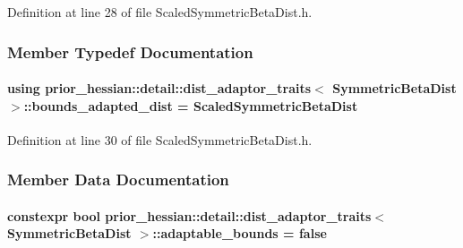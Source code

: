 Definition at line 28 of file Scaled\+Symmetric\+Beta\+Dist.\+h.



\subsubsection{Member Typedef Documentation}
\paragraph[{\texorpdfstring{bounds\+\_\+adapted\+\_\+dist}{bounds_adapted_dist}}]{\setlength{\rightskip}{0pt plus 5cm}using {\bf prior\+\_\+hessian\+::detail\+::dist\+\_\+adaptor\+\_\+traits}$<$ {\bf Symmetric\+Beta\+Dist} $>$\+::{\bf bounds\+\_\+adapted\+\_\+dist} =  {\bf Scaled\+Symmetric\+Beta\+Dist}}\hypertarget{structprior__hessian_1_1detail_1_1dist__adaptor__traits_3_01SymmetricBetaDist_01_4_a64a7abf2a59990f45dcd32d226016bf3}{}\label{structprior__hessian_1_1detail_1_1dist__adaptor__traits_3_01SymmetricBetaDist_01_4_a64a7abf2a59990f45dcd32d226016bf3}


Definition at line 30 of file Scaled\+Symmetric\+Beta\+Dist.\+h.



\subsubsection{Member Data Documentation}
\paragraph[{\texorpdfstring{adaptable\+\_\+bounds}{adaptable_bounds}}]{\setlength{\rightskip}{0pt plus 5cm}constexpr bool {\bf prior\+\_\+hessian\+::detail\+::dist\+\_\+adaptor\+\_\+traits}$<$ {\bf Symmetric\+Beta\+Dist} $>$\+::adaptable\+\_\+bounds = false\hspace{0.3cm}{\ttfamily [static]}}\hypertarget{structprior__hessian_1_1detail_1_1dist__adaptor__traits_3_01SymmetricBetaDist_01_4_ac1f8cdd947f6ea1503cd3deca19178ad}{}\label{structprior__hessian_1_1detail_1_1dist__adaptor__traits_3_01SymmetricBetaDist_01_4_ac1f8cdd947f6ea1503cd3deca19178ad}


